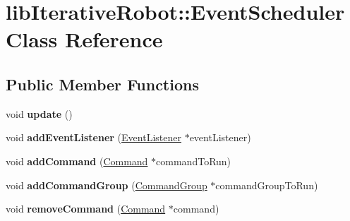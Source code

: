 \hypertarget{classlib_iterative_robot_1_1_event_scheduler}{}\section{lib\+Iterative\+Robot\+::Event\+Scheduler Class Reference}
\label{classlib_iterative_robot_1_1_event_scheduler}
\subsection*{Public Member Functions}
\begin{DoxyCompactItemize}
\item 
\mbox{\label{classlib_iterative_robot_1_1_event_scheduler_a9643c8e8dd7a87a1a3419415c7cc46bc}} 
void {\bfseries update} ()
\item 
\mbox{\label{classlib_iterative_robot_1_1_event_scheduler_ad6e214ce9686a58eb37fb71796531b4e}} 
void {\bfseries add\+Event\+Listener} (\mbox{\hyperlink{classlib_iterative_robot_1_1_event_listener}{Event\+Listener}} $\ast$event\+Listener)
\item 
\mbox{\label{classlib_iterative_robot_1_1_event_scheduler_aac82a5f0c53789fe6170085b033efbbc}} 
void {\bfseries add\+Command} (\mbox{\hyperlink{classlib_iterative_robot_1_1_command}{Command}} $\ast$command\+To\+Run)
\item 
\mbox{\label{classlib_iterative_robot_1_1_event_scheduler_a24dfdf47117ffa162f74042345f57d94}} 
void {\bfseries add\+Command\+Group} (\mbox{\hyperlink{classlib_iterative_robot_1_1_command_group}{Command\+Group}} $\ast$command\+Group\+To\+Run)
\item 
\mbox{\label{classlib_iterative_robot_1_1_event_scheduler_a038be4eb06e564fe47d326b458a8985c}} 
void {\bfseries remove\+Command} (\mbox{\hyperlink{classlib_iterative_robot_1_1_command}{Command}} $\ast$command)
\item 
\mbox{\label{classlib_iterative_robot_1_1_event_scheduler_a6c1501cbee6a630b2b63881aa200fdf4}} 

\end{DoxyCompactItemize}
